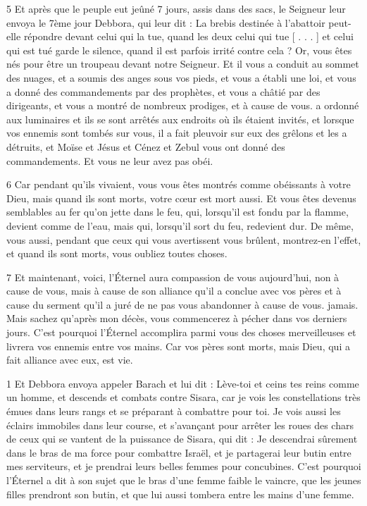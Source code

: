 \par 5 Et après que le peuple eut jeûné 7 jours, assis dans des sacs, le Seigneur leur envoya le 7ème jour Debbora, qui leur dit : La brebis destinée à l'abattoir peut-elle répondre devant celui qui la tue, quand les deux celui qui tue [ . . . ] et celui qui est tué garde le silence, quand il est parfois irrité contre cela ? Or, vous êtes nés pour être un troupeau devant notre Seigneur. Et il vous a conduit au sommet des nuages, et a soumis des anges sous vos pieds, et vous a établi une loi, et vous a donné des commandements par des prophètes, et vous a châtié par des dirigeants, et vous a montré de nombreux prodiges, et à cause de vous. a ordonné aux luminaires et ils se sont arrêtés aux endroits où ils étaient invités, et lorsque vos ennemis sont tombés sur vous, il a fait pleuvoir sur eux des grêlons et les a détruits, et Moïse et Jésus et Cénez et Zebul vous ont donné des commandements. Et vous ne leur avez pas obéi.

\par 6 Car pendant qu'ils vivaient, vous vous êtes montrés comme obéissants à votre Dieu, mais quand ils sont morts, votre cœur est mort aussi. Et vous êtes devenus semblables au fer qu'on jette dans le feu, qui, lorsqu'il est fondu par la flamme, devient comme de l'eau, mais qui, lorsqu'il sort du feu, redevient dur. De même, vous aussi, pendant que ceux qui vous avertissent vous brûlent, montrez-en l'effet, et quand ils sont morts, vous oubliez toutes choses.

\par 7 Et maintenant, voici, l'Éternel aura compassion de vous aujourd'hui, non à cause de vous, mais à cause de son alliance qu'il a conclue avec vos pères et à cause du serment qu'il a juré de ne pas vous abandonner à cause de vous. jamais. Mais sachez qu'après mon décès, vous commencerez à pécher dans vos derniers jours. C'est pourquoi l'Éternel accomplira parmi vous des choses merveilleuses et livrera vos ennemis entre vos mains. Car vos pères sont morts, mais Dieu, qui a fait alliance avec eux, est vie.


\par 1 Et Debbora envoya appeler Barach et lui dit : Lève-toi et ceins tes reins comme un homme, et descends et combats contre Sisara, car je vois les constellations très émues dans leurs rangs et se préparant à combattre pour toi. Je vois aussi les éclairs immobiles dans leur course, et s'avançant pour arrêter les roues des chars de ceux qui se vantent de la puissance de Sisara, qui dit : Je descendrai sûrement dans le bras de ma force pour combattre Israël, et je partagerai leur butin entre mes serviteurs, et je prendrai leurs belles femmes pour concubines. C'est pourquoi l'Éternel a dit à son sujet que le bras d'une femme faible le vaincre, que les jeunes filles prendront son butin, et que lui aussi tombera entre les mains d'une femme.

